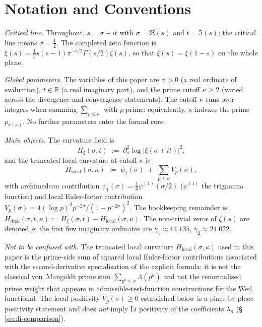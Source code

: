 \documentclass[11pt]{article}
\newcommand{\Hxi}{H_{\xi}}
\newcommand{\Hlocal}{H_{\mathrm{local}}}
\newcommand{\Hdual}{H_{\mathrm{dual}}}
\begin{document}
\vspace{2em}

\section*{Notation and Conventions}
\label{sec:notation}

\emph{Critical line.}
Throughout, $s=\sigma+it$ with $\sigma=\Re(s)$ and $t=\Im(s)$;
the critical line means $\sigma=\tfrac12$.
The completed zeta function is
$\xi(s)=\tfrac12 s(s-1)\pi^{-s/2}\Gamma(s/2)\zeta(s)$, so that
$\xi(s)=\xi(1-s)$ on the whole plane.

\medskip
\emph{Global parameters.}
The variables of this paper are $\sigma>0$ (a real ordinate
of evaluation), $t\in\mathbb{R}$ (a real imaginary part), and
the prime cutoff $\kappa\ge 2$ (varied across the divergence
and convergence statements).
The cutoff $\kappa$ runs over integers when summing
$\sum_{p\le\kappa}$ with $p$ prime; equivalently, $\kappa$
indexes the prime $p_{\pi(\kappa)}$.
No further parameters enter the formal core.

\medskip
\emph{Main objects.}
The curvature field is
\[
\Hxi(\sigma,t)\;:=\;\partial_{\sigma}^{2}\log
\lvert\xi(\sigma+it)\rvert^{2},
\]
and the truncated local curvature at cutoff $\kappa$ is
\[
\Hlocal(\sigma,\kappa)\;:=\;\psi_1(\sigma)
\;+\;\sum_{p\le\kappa}V_p(\sigma),
\]
with archimedean contribution
$\psi_1(\sigma)=\tfrac18\psi^{(1)}(\sigma/2)$
($\psi^{(1)}$ the trigamma function) and local Euler-factor
contribution $V_p(\sigma)=4(\log p)^2 p^{-2\sigma}/
(1-p^{-2\sigma})^2$.
The bookkeeping remainder is
$\Hdual(\sigma,t,\kappa):=\Hxi(\sigma,t)-\Hlocal(\sigma,\kappa)$.
The non-trivial zeros of $\zeta(s)$ are denoted $\rho$; the
first few imaginary ordinates are $\gamma_1\approx 14.135$,
$\gamma_2\approx 21.022$.

\medskip
\emph{Not to be confused with.}
The truncated local curvature $\Hlocal(\sigma,\kappa)$ used in
this paper is the prime-side sum of squared local Euler-factor
contributions associated with the second-derivative
specialisation of the explicit formula; it is not the
classical von~Mangoldt prime sum
$\sum_{p^k\le x}\Lambda(p^k)$ and not the renormalised prime
weight that appears in admissible-test-function constructions
for the Weil functional.
The local positivity $V_p(\sigma)\ge 0$ established below is
a place-by-place positivity statement and does \emph{not}
imply Li positivity of the coefficients $\lambda_n$
(\S\,\ref{sec:li-comparison}).
\end{document}
